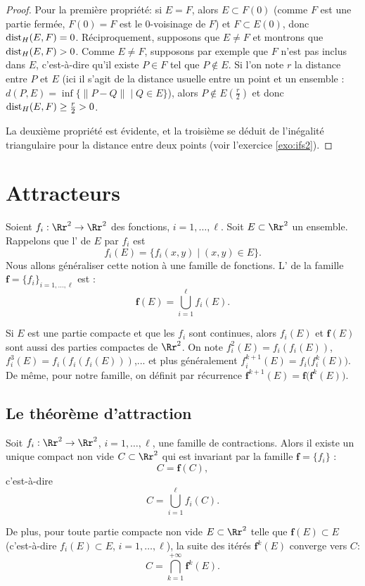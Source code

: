 \documentclass[11pt,class=report,crop=false]{standalone}
\begin{document}
\begin{proof}
Pour la première propriété: 
si $E=F$, alors $E \subset F(0)$ (comme $F$ est une partie fermée, $F(0)=F$ est le $0$-voisinage de $F$) et $F \subset E(0)$, donc $\text{dist}_H(E,F)=0$.
Réciproquement, supposons que $E \neq F$ et montrons que $\text{dist}_H(E,F)>0$.
Comme $E\neq F$, supposons par exemple que $F$ n'est pas inclus dans $E$, c'est-à-dire qu'il existe $P\in F$ tel que $P\notin E$.
Si l'on note $r$ la distance entre $P$ et $E$ (ici il s'agit de la distance
usuelle entre un point et un ensemble : $d(P,E)=\inf\{ \|P-Q\| \mid Q \in E\}$),
alors $P \notin E(\frac r 2)$ et donc $\text{dist}_H(E,F) \ge \frac r2 >0$.

La deuxième propriété est évidente, et la troisième se déduit 
de l'inégalité triangulaire pour la distance entre deux points (voir l'exercice \ref{exo:ifs2}).
\end{proof}


\section{Attracteurs}

Soient $f_i : \Rr^2 \to \Rr^2$ des fonctions, $i=1,\ldots,\ell$. 
Soit $E \subset \Rr^2$ un ensemble.
Rappelons que l' de $E$ par $f_i$ est
$$f_i(E) =\big\{ f_i(x,y) \mid (x,y) \in E \big\}.$$
Nous allons généraliser cette notion à une famille de fonctions. 
L' de la famille 
$\mathbf{f}=\{f_i\}_{i=1,\ldots,\ell}$ est :
$$\mathbf{f}(E) = \bigcup_{i=1}^{\ell} f_i(E).$$

Si $E$ est une partie compacte et que les $f_i$ sont continues, alors $f_i(E)$
et $\mathbf{f}(E)$ sont aussi des parties compactes de $\Rr^2$.
On note $f_i^2(E) = f_i(f_i(E))$, $f_i^3(E) = f_i(f_i(f_i(E)))$,...
et plus généralement $f_i^{k+1}(E) = f_i \big(f_i^k(E)\big)$.
De même, pour notre famille, on définit par récurrence
 $\mathbf{f}^{k+1}(E) = \mathbf{f} \big( \mathbf{f}^k(E)\big)$.

\subsection{Le théorème d'attraction}


\begin{theoreme}
\label{th:attraction}
Soit $f_i : \Rr^2 \to \Rr^2$, $i=1,\ldots,\ell$, une famille de contractions.
Alors il existe un unique compact non vide $C \subset \Rr^2$ qui est invariant par la famille
$\mathbf{f} = \{f_i\}$ :
$$C= \mathbf{f}(C),$$
c'est-à-dire 
$$C = \bigcup_{i=1}^{\ell} f_i(C).$$

De plus, pour toute partie compacte non vide $E \subset \Rr^2$ telle que 
$\mathbf{f}(E) \subset E$ (c'est-à-dire $f_i(E) \subset E$, $i=1,\ldots,\ell$),
la suite des itérés 
$\mathbf{f}^k(E)$ converge vers $C$:
$$C = \bigcap_{k=1}^{+\infty} \mathbf{f}^k(E).$$
\end{theoreme}
\end{document}
